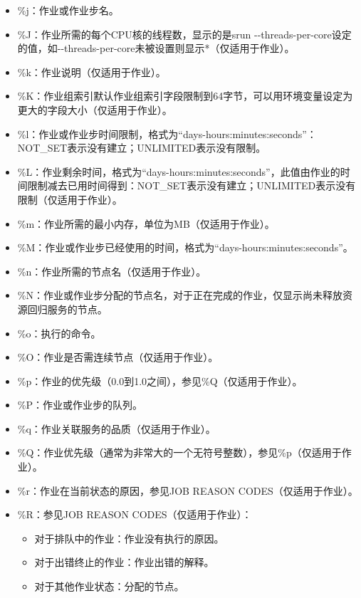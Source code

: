 \begin{itemize}
\begin{itemize}
\begin{itemize}
    \item \%j：作业或作业步名。
	\item \%J：作业所需的每个CPU核的线程数，显示的是srun -{}-threads-per-core设定的值，如-{}-threads-per-core未被设置则显示*（仅适用于作业）。
    \item \%k：作业说明（仅适用于作业）。
    \item \%K：作业组索引默认作业组索引字段限制到64字节，可以用环境变量设定为更大的字段大小（仅适用于作业）。
    \item \%l：作业或作业步时间限制，格式为``days-hours:minutes:seconds''：NOT\_SET表示没有建立；UNLIMITED表示没有限制。
    \item \%L：作业剩余时间，格式为``days-hours:minutes:seconds''，此值由作业的时间限制减去已用时间得到：NOT\_SET表示没有建立；UNLIMITED表示没有限制（仅适用于作业）。
    \item \%m：作业所需的最小内存，单位为MB（仅适用于作业）。
    \item \%M：作业或作业步已经使用的时间，格式为``days-hours:minutes:seconds''。
    \item \%n：作业所需的节点名（仅适用于作业）。
    \item \%N：作业或作业步分配的节点名，对于正在完成的作业，仅显示尚未释放资源回归服务的节点。
    \item \%o：执行的命令。
    \item \%O：作业是否需连续节点（仅适用于作业）。
    \item \%p：作业的优先级（0.0到1.0之间），参见\%Q（仅适用于作业）。
    \item \%P：作业或作业步的队列。
    \item \%q：作业关联服务的品质（仅适用于作业）。
    \item \%Q：作业优先级（通常为非常大的一个无符号整数），参见\%p（仅适用于作业）。
    \item \%r：作业在当前状态的原因，参见JOB REASON CODES（仅适用于作业）。
    \item \%R：参见JOB REASON CODES（仅适用于作业）：
		\begin{itemize}
			\item 对于排队中的作业：作业没有执行的原因。
			\item 对于出错终止的作业：作业出错的解释。
			\item 对于其他作业状态：分配的节点。
		\end{itemize}

\end{itemize}
\end{itemize}
\end{itemize}
